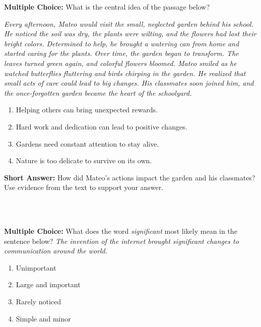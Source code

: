 \documentclass[12pt]{article}
\begin{document}
\begin{tcolorbox}[colframe=black!50, colback=white, title=Question 2]
\textbf{Multiple Choice:} What is the central idea of the passage below?  

\textit{Every afternoon, Mateo would visit the small, neglected garden behind his school. He noticed the soil was dry, the plants were wilting, and the flowers had lost their bright colors. Determined to help, he brought a watering can from home and started caring for the plants. Over time, the garden began to transform. The leaves turned green again, and colorful flowers bloomed. Mateo smiled as he watched butterflies fluttering and birds chirping in the garden. He realized that small acts of care could lead to big changes. His classmates soon joined him, and the once-forgotten garden became the heart of the schoolyard.}

\begin{enumerate}[label=(\Alph*)]
\item Helping others can bring unexpected rewards.  
\item Hard work and dedication can lead to positive changes.  
\item Gardens need constant attention to stay alive.  
\item Nature is too delicate to survive on its own.  
\end{enumerate}
\end{tcolorbox}

\begin{tcolorbox}[colframe=black!50, colback=white, title=Question 3]
\textbf{Short Answer:} How did Mateo’s actions impact the garden and his classmates? Use evidence from the text to support your answer.  

\vspace{2em}
 \underline{\hspace{15.8cm}}  
    \\[0.8cm] \underline{\hspace{15.8cm}}  
    \\[0.8cm] \underline{\hspace{15.8cm}}  
\end{tcolorbox}

\begin{tcolorbox}[colframe=black!50, colback=white, title=Question 4]
\textbf{Multiple Choice:} What does the word \textit{significant} most likely mean in the sentence below?  
\textit{The invention of the internet brought significant changes to communication around the world.}  
\begin{enumerate}[label=(\Alph*)]
\item Unimportant  
\item Large and important  
\item Rarely noticed  
\item Simple and minor  
\end{enumerate}
\end{tcolorbox}
\end{document}
